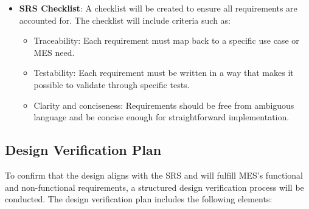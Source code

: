 \documentclass[12pt, titlepage]{article}
\begin{document}
\begin{itemize}
    \item \textbf{SRS Checklist}: A checklist will be created to ensure all requirements are accounted for. The checklist will include criteria such as:
    \begin{itemize}
        \item Traceability: Each requirement must map back to a specific use case or MES need.
        \item Testability: Each requirement must be written in a way that makes it possible to validate through specific tests.
        \item Clarity and conciseness: Requirements should be free from ambiguous language and be concise enough for straightforward implementation.
    \end{itemize}
\end{itemize}

\subsection{Design Verification Plan}
To confirm that the design aligns with the SRS and will fulfill MES’s functional and non-functional requirements, a structured design verification process will be conducted. The design verification plan includes the following elements:
\end{document}
